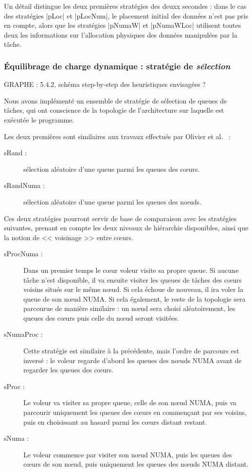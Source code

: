 Un détail distingue les deux premières stratégies des deuxx secondes : dans le cas des stratégies |pLoc| et |pLocNum|, le placement initial des données n'est pas pris en compte, alors que les stratégies |pNumaW| et |pNumaWLoc| utilisent toutes deux les informations sur l'allocation physiques des données manipulées par la tâche.

\subsubsection{Équilibrage de charge dynamique : stratégie de \emph{sélection}}
\label{sec:openmp:runtime:select}

GRAPHE : 5.4.2, schéma step-by-step des heuristiques envisagées ?

Nous avons implémenté un ensemble de stratégie de sélection de queues de tâches, qui ont conscience de la topologie de l'architecture sur laquelle est exécutée le programme.

Les deux premières sont similaires aux travaux effectués par Olivier et al.~\cite{Olivier2012} :
\begin{description}
  \item [sRand :] sélection aléatoire d'une queue parmi les queues des cœurs.
  \item [sRandNuma :] sélection aléatoire d'une queue parmi les queues des nœuds.
\end{description}

Ces deux stratégies pourront servir de base de comparaison avec les stratégies suivantes, prenant en compte les deux niveaux de hiérarchie disponibles, ainsi que la notion de << voisinage >> entre cœurs.

\begin{description}
  \item [sProcNuma :] Dans un premier temps le cœur voleur visite sa propre queue. Si aucune tâche n'est disponible, il va ensuite visiter les queues de tâches des cœurs voisins situés sur le même nœud.
    Si cela échoue de nouveau, il ira voler la queue de son nœud NUMA.
    Si cela également, le reste de la topologie sera parcourue de manière similaire : un nœud sera choisi aléatoirement, les queues des cœurs puis celle du nœud seront visitées.
  \item [sNumaProc :] Cette stratégie est similaire à la précédente, mais l'ordre de parcours est inversé : le voleur regarde d'abord les queues des nœuds NUMA avant de regarder les queues des cœurs.
  \item [sProc :] Le voleur va visiter sa propre queue, celle de son nœud NUMA, puis va parcourir uniquement les queues des cœurs en commençant par ses voisins, puis en choisissant au hasard parmi les cœurs distant restant.
  \item [sNuma :] Le voleur commence par visiter son nœud NUMA, puis les queues des cœurs de son nœud, puis uniquement les queues des nœuds NUMA distant.
\end{description}

